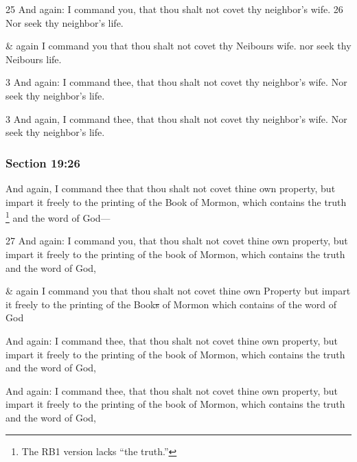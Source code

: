 		\begin{framed}
		\scriptsize
			\begin{compactdesc}
				\item[JSP] 25 And again: I command you, that thou shalt not covet thy neighbor's wife. 26 Nor seek thy neighbor's life.
				\item[RB1] \& again I command you that thou shalt not covet thy Neibours wife. nor seek thy Neibours life.
				\item[DC 1835] 3 And again: I command thee, that thou shalt not covet thy neighbor's wife. Nor seek thy neighbor's life. 
				\item[DC 1844] 3 And again, I command thee, that thou shalt not covet thy neighbor's wife. Nor seek thy neighbor's life. 
			\end{compactdesc}
		\end{framed}

	\subsubsection{Section 19:26} %
		\label{DC19-26}

		And again, I command thee that thou shalt not covet thine own property, but impart it freely to the printing of the Book of Mormon, which contains the truth%
			\footnote{%
				The RB1 version lacks ``the truth.''
				}
		and the word of God---

		\begin{framed}
		\scriptsize
			\begin{compactdesc}
				\item[JSP] 27 And again: I command you, that thou shalt not covet thine own property, but impart it freely to the printing of the book of Mormon, which contains the truth and the word of God,
				\item[RB1] \& again I command you that thou shalt not covet thine own Property but impart it freely to the printing of the Book\sout{s} of Mormon which contains of the word of God
				\item[DC 1835] And again: I command thee, that thou shalt not covet thine own property, but impart it freely to the printing of the book of Mormon, which contains the truth and the word of God, 
				\item[DC 1844] And again: I command thee, that thou shalt not covet thine own property, but impart it freely to the printing of the book of Mormon, which contains the truth and the word of God, 
			\end{compactdesc}
		\end{framed}

